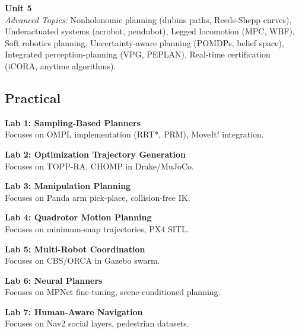 \vspace{0.3cm}

\noindent\textbf{Unit 5} \\
\textit{Advanced Topics:} Nonholonomic planning (dubins paths, Reeds-Shepp curves), Underactuated systems (acrobot, pendubot), Legged locomotion (MPC, WBF), Soft robotics planning, Uncertainty-aware planning (POMDPs, belief space), Integrated perception-planning (VPG, PEPLAN), Real-time certification (iCORA, anytime algorithms).

\newpage

\subsection*{Practical}
\noindent\textbf{Lab 1: Sampling-Based Planners} \\
Focuses on OMPL implementation (RRT*, PRM), MoveIt! integration.

\vspace{0.2cm}

\noindent\textbf{Lab 2: Optimization Trajectory Generation} \\
Focuses on TOPP-RA, CHOMP in Drake/MuJoCo.

\vspace{0.2cm}

\noindent\textbf{Lab 3: Manipulation Planning} \\
Focuses on Panda arm pick-place, collision-free IK.

\vspace{0.2cm}

\noindent\textbf{Lab 4: Quadrotor Motion Planning} \\
Focuses on minimum-snap trajectories, PX4 SITL.

\vspace{0.2cm}

\noindent\textbf{Lab 5: Multi-Robot Coordination} \\
Focuses on CBS/ORCA in Gazebo swarm.

\vspace{0.2cm}

\noindent\textbf{Lab 6: Neural Planners} \\
Focuses on MPNet fine-tuning, scene-conditioned planning.

\vspace{0.2cm}

\noindent\textbf{Lab 7: Human-Aware Navigation} \\
Focuses on Nav2 social layers, pedestrian datasets.

